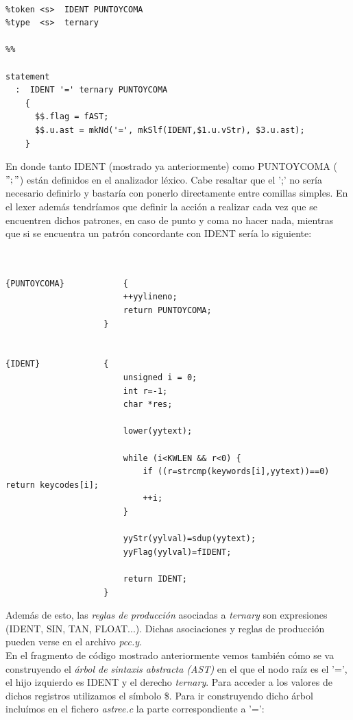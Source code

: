 \documentclass[11pt]{article}
\begin{document}
\begin{verbatim}

%token <s>  IDENT PUNTOYCOMA
%type  <s>  ternary 

%%

statement
  :  IDENT '=' ternary PUNTOYCOMA
    {
      $$.flag = fAST;
      $$.u.ast = mkNd('=', mkSlf(IDENT,$1.u.vStr), $3.u.ast);
    }

\end{verbatim}

\noindent En donde tanto IDENT (mostrado ya anteriormente) como PUNTOYCOMA ($";"$) están definidos en el analizador léxico. Cabe resaltar que el ';' no sería necesario definirlo y bastaría con ponerlo directamente entre comillas simples. En el lexer además tendríamos que definir la acción a realizar cada vez que se encuentren dichos patrones, en caso de punto y coma no hacer nada, mientras que si se encuentra un patrón concordante con IDENT sería lo siguiente:

\begin{verbatim}


{PUNTOYCOMA}            {
                        ++yylineno;
                        return PUNTOYCOMA;
                    }


{IDENT}             {
                        unsigned i = 0;
                        int r=-1;
                        char *res;

                        lower(yytext);

                        while (i<KWLEN && r<0) {
                            if ((r=strcmp(keywords[i],yytext))==0) return keycodes[i];
                            ++i;
                        }

                        yyStr(yylval)=sdup(yytext);
                        yyFlag(yylval)=fIDENT;

                        return IDENT;
                    }

\end{verbatim}

\noindent Además de esto, las \textit{reglas de producción} asociadas a \textit{ternary} son expresiones (IDENT, SIN, TAN, FLOAT...). Dichas asociaciones y reglas de producción pueden verse en el archivo \textit{pcc.y}. \\
\noindent En el fragmento de código mostrado anteriormente vemos también cómo se va construyendo el \textit{árbol de sintaxis abstracta (AST)} en el que el nodo raíz es el '=', el hijo izquierdo es IDENT y el derecho \textit{ternary}. Para acceder a los valores de dichos registros utilizamos el símbolo \$. Para ir construyendo dicho árbol incluímos en el fichero \textit{astree.c} la parte correspondiente a '=':
\end{document}
